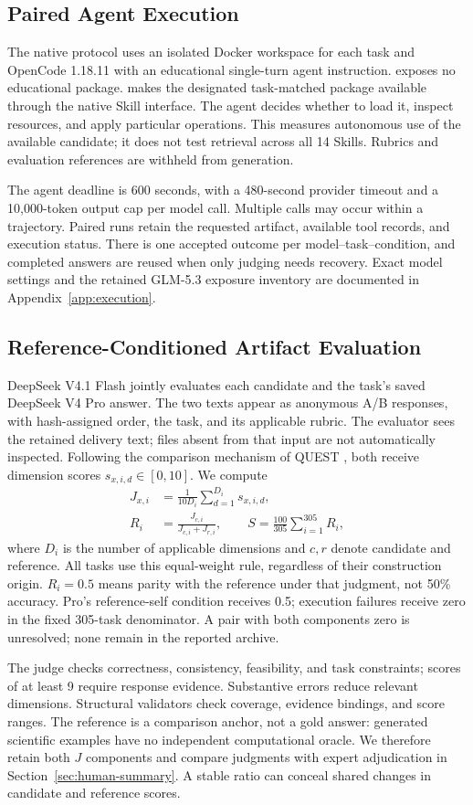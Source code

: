 \subsection{Paired Agent Execution}
\label{sec:protocol}
The native protocol uses an isolated Docker workspace for each task and
OpenCode 1.18.11 with an educational single-turn agent instruction.
\noskill{} exposes no educational package. \withskill{} makes the designated
task-matched package available through the native Skill interface. The agent
decides whether to load it, inspect resources, and apply particular operations.
This measures autonomous use of the available candidate; it does not test
retrieval across all 14 Skills. Rubrics and evaluation references are withheld
from generation.

The agent deadline is 600 seconds, with a 480-second provider timeout and a
10,000-token output cap per model call. Multiple calls may occur within a
trajectory. Paired runs retain the requested artifact, available tool records,
and execution status. There is one accepted outcome per model--task--condition,
and completed answers are reused when only judging needs recovery.
Exact model settings and the retained GLM-5.3 exposure inventory are documented
in Appendix~\ref{app:execution}.

\subsection{Reference-Conditioned Artifact Evaluation}
\label{sec:judge}
DeepSeek V4.1 Flash jointly evaluates each candidate and the task's saved
DeepSeek V4 Pro \noskill{} answer. The two texts appear as anonymous A/B
responses, with hash-assigned order, the task, and its applicable rubric.
The evaluator sees the retained delivery text; files absent from that input
are not automatically inspected.
Following the comparison mechanism of QUEST \citep{quest}, both receive
dimension scores $s_{x,i,d}\in[0,10]$. We compute
\begin{align}
J_{x,i}&=\frac{1}{10D_i}\sum_{d=1}^{D_i}s_{x,i,d},\\
R_i&=\frac{J_{c,i}}{J_{c,i}+J_{r,i}},\qquad
S=\frac{100}{305}\sum_{i=1}^{305}R_i,
\label{eq:refscore}
\end{align}
where $D_i$ is the number of applicable dimensions and $c,r$ denote candidate
and reference. All tasks use this equal-weight rule, regardless of their
construction origin. $R_i=0.5$ means parity with the reference under that
judgment, not 50\% accuracy. Pro's reference-self condition receives 0.5;
execution failures receive zero in the fixed 305-task denominator. A pair
with both components zero is unresolved; none remain in the reported archive.

The judge checks correctness, consistency, feasibility, and task constraints;
scores of at least 9 require response evidence. Substantive errors reduce
relevant dimensions. Structural validators check coverage, evidence bindings,
and score ranges. The reference is a comparison anchor, not a gold answer:
generated scientific examples have no independent computational oracle.
We therefore retain both $J$ components and compare judgments with expert
adjudication in Section~\ref{sec:human-summary}. A stable ratio can conceal
shared changes in candidate and reference scores.
